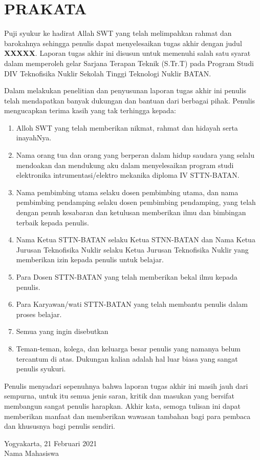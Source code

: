 \chapter*{PRAKATA}

\doublespacing
Puji syukur ke hadirat Allah SWT yang telah melimpahkan rahmat dan barokahnya sehingga penulis dapat menyelesaikan tugas akhir dengan judul \textbf{XXXXX}. Laporan tugas akhir ini disusun untuk memenuhi salah satu syarat dalam memperoleh gelar Sarjana Terapan Teknik (S.Tr.T) pada Program Studi DIV Teknofisika Nuklir Sekolah Tinggi Teknologi Nuklir BATAN.

Dalam melakukan penelitian dan penyusunan laporan tugas akhir ini penulis telah mendapatkan banyak dukungan dan bantuan dari berbagai pihak. Penulis mengucapkan terima kasih yang tak terhingga kepada:

\onehalfspacing
\begin{enumerate}
	\item Alloh SWT yang telah memberikan nikmat, rahmat dan hidayah serta inayahNya.
	\item Nama orang tua dan orang yang berperan dalam hidup saudara yang selalu mendoakan dan mendukung aku dalam menyelesaikan program studi elektronika intrumentasi/elektro mekanika diploma IV STTN-BATAN.
	\item Nama pembimbing utama selaku dosen pembimbing utama, dan nama pembimbing pendamping selaku dosen pembimbing pendamping, yang telah dengan penuh kesabaran dan ketulusan memberikan ilmu dan bimbingan terbaik kepada penulis. 
	\item Nama Ketua STTN-BATAN selaku Ketua STNN-BATAN dan Nama Ketua Jurusan Teknofisika Nuklir selaku Ketua Jurusan Teknofisika Nuklir yang memberikan izin kepada penulis untuk belajar.
	\item Para Dosen STTN-BATAN yang telah memberikan bekal ilmu kepada penulis.
	\item Para Karyawan/wati STTN-BATAN yang telah membantu penulis dalam proses belajar.
	\item Semua yang ingin disebutkan
	\item Teman-teman, kolega, dan keluarga besar penulis yang namanya belum tercantum di atas. Dukungan kalian adalah hal luar biasa yang sangat penulis syukuri.
\end{enumerate}

\doublespacing
Penulis menyadari sepenuhnya bahwa laporan tugas akhir ini masih jauh dari sempurna, untuk itu semua jenis saran, kritik dan masukan yang bersifat membangun sangat penulis harapkan. Akhir kata, semoga tulisan ini dapat memberikan manfaat dan memberikan wawasan tambahan bagi para pembaca dan khususnya bagi penulis sendiri.

\begin{flushright}
	Yogyakarta, 21 Februari 2021\\[1cm]
	Nama Mahasiswa
\end{flushright}